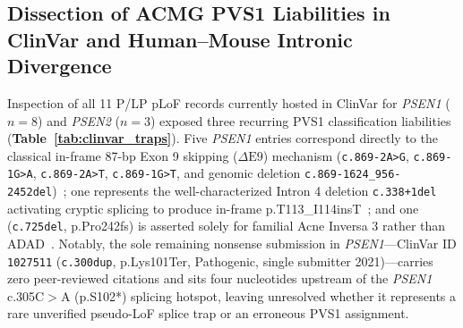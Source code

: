 \documentclass[11pt,a4paper]{article}
\begin{document}
\subsection{Dissection of ACMG PVS1 Liabilities in ClinVar and Human--Mouse Intronic Divergence}
Inspection of all 11 P/LP pLoF records currently hosted in ClinVar for \textit{PSEN1} ($n=8$) and \textit{PSEN2} ($n=3$) exposed three recurring PVS1 classification liabilities (\textbf{Table~\ref{tab:clinvar_traps}}). Five \textit{PSEN1} entries correspond directly to the classical in-frame 87-bp Exon 9 skipping ($\Delta\text{E9}$) mechanism (\texttt{c.869-2A>G}, \texttt{c.869-1G>A}, \texttt{c.869-2A>T}, \texttt{c.869-1G>T}, and genomic deletion \texttt{c.869-1624\_956-2452del})~\cite{pereztur1995}; one represents the well-characterized Intron 4 deletion \texttt{c.338+1del} activating cryptic splicing to produce in-frame p.T113\_I114insT~\cite{dejonghe1999,arber2019}; and one (\texttt{c.725del}, p.Pro242fs) is asserted solely for familial Acne Inversa 3 rather than ADAD~\cite{wang2010}. Notably, the sole remaining nonsense submission in \textit{PSEN1}—ClinVar ID \texttt{1027511} (\texttt{c.300dup}, p.Lys101Ter, Pathogenic, single submitter 2021)—carries zero peer-reviewed citations and sits four nucleotides upstream of the \textit{PSEN1} c.305C$>$A (p.S102*) splicing hotspot, leaving unresolved whether it represents a rare unverified pseudo-LoF splice trap or an erroneous PVS1 assignment.
\end{document}

